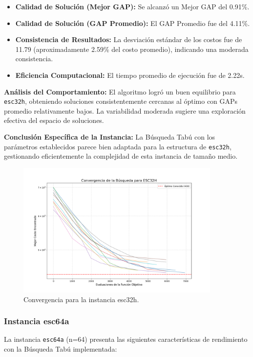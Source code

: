 \documentclass[12pt, a4paper]{article}
\begin{document}
\begin{itemize}
    \item \textbf{Calidad de Solución (Mejor GAP):} Se alcanzó un Mejor GAP del 0.91\%.
    \item \textbf{Calidad de Solución (GAP Promedio):} El GAP Promedio fue del 4.11\%.
    \item \textbf{Consistencia de Resultados:} La desviación estándar de los costos fue de 11.79 (aproximadamente 2.59\% del costo promedio), indicando una moderada consistencia.
    \item \textbf{Eficiencia Computacional:} El tiempo promedio de ejecución fue de 2.22s.
\end{itemize}

\textbf{Análisis del Comportamiento:}
El algoritmo logró un buen equilibrio para \texttt{esc32h}, obteniendo soluciones consistentemente cercanas al óptimo con GAPs promedio relativamente bajos. La variabilidad moderada sugiere una exploración efectiva del espacio de soluciones.

\textbf{Conclusión Específica de la Instancia:}
La Búsqueda Tabú con los parámetros establecidos parece bien adaptada para la estructura de \texttt{esc32h}, gestionando eficientemente la complejidad de esta instancia de tamaño medio.
\begin{figure}[H]
\centering
\includegraphics[width=0.9\textwidth]{../results/graphs/esc32h_convergence.png}
\caption{Convergencia para la instancia esc32h.}
\label{fig:esc32h_conv}
\end{figure}

\newpage
\subsubsection{Instancia esc64a}
La instancia \texttt{esc64a} (n=64) presenta las siguientes características de rendimiento con la Búsqueda Tabú implementada:
\end{document}
